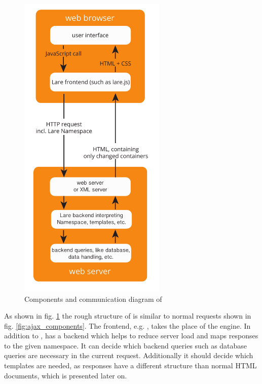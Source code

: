 \begin{figure}[H]
\centering
\includegraphics[height=15cm]{images/lare.pdf}
\caption[lare_components]{Components and communication diagram of \lare{}}
\label{fig:lare_components}
\end{figure}


\noindent{}As shown in fig. \ref{fig:lare_components} the rough structure of \lare{} is similar to normal \ajax{} requests shown in fig. \ref{fig:ajax_components}.
The \lare{} frontend, e.g. \lareJS{}, takes the place of the \ajax{} engine.
In addition to \ajax{}, \lare{} has a backend which helps to reduce server load and maps responses to the given namespace.
It can decide which backend queries such as database queries are necessary in the current request.
Additionally it should decide which templates are needed, as \lare{} responses have a different structure than normal HTML documents, which is presented later on.

